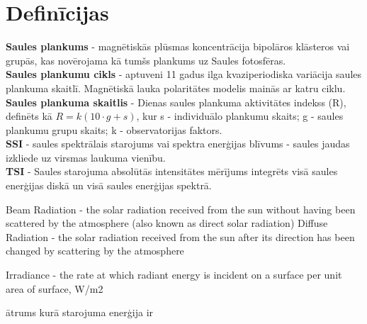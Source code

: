 \section{Definīcijas}
\noindent \textbf{Saules plankums} - magnētiskās plūsmas koncentrācija bipolāros klāsteros vai grupās, kas novērojama kā tumšs plankums uz Saules fotosfēras.\\
\textbf{Saules plankumu cikls} - aptuveni 11 gadus ilga kvaziperiodiska variācija saules plankuma skaitlī. Magnētiskā lauka polaritātes modelis mainās ar katru ciklu.\\
\textbf{Saules plankuma skaitlis} - Dienas saules plankuma aktivitātes indekss (R), definēts kā $R = k(10 \cdot g + s)$, kur
s - individuālo plankumu skaits;
g - saules plankumu grupu skaits;
k - observatorijas faktors.\\
\textbf{SSI} - saules spektrālais starojums vai spektra enerģijas blīvums - saules jaudas izkliede uz virsmas laukuma vienību.\\
\textbf{TSI} - Saules starojuma absolūtās intensitātes mērījums integrēts visā saules enerģijas diskā un visā saules enerģijas spektrā.

Beam Radiation - the solar radiation received from the sun without having been scattered by the atmosphere (also known as direct solar radiation)
Diffuse Radiation - the solar radiation received from the sun after its direction has been changed by scattering by the atmosphere

Irradiance -  the rate at which radiant energy is incident on a surface per unit area of surface, W/m2

ātrums kurā starojuma enerģija ir 